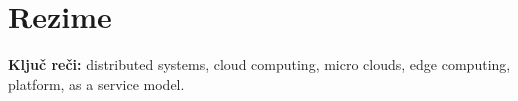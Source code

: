 \chapter*{Rezime}
\pagestyle{plain}

\noindent
\textbf{Klju\v c re\v ci:} distributed systems, cloud computing, micro clouds, edge computing, platform, as a service model.
